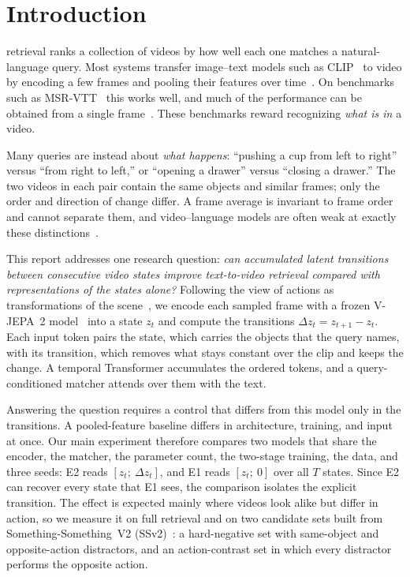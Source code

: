 \documentclass[lettersize,journal]{IEEEtran}
\begin{document}
\section{Introduction}
 retrieval ranks a collection of videos by how
well each one matches a natural-language query. Most systems transfer
image--text models such as CLIP~\cite{radford2021clip} to video by encoding a
few frames and pooling their features over
time~\cite{luo2022clip4clip,ma2022xclip,bain2021frozen}. On benchmarks such as
MSR-VTT~\cite{xu2016msrvtt} this works well, and much of the performance can be
obtained from a single frame~\cite{buch2022atp,lei2023singleframe}. These
benchmarks reward recognizing \emph{what is in} a video.

Many queries are instead about \emph{what happens}: ``pushing a cup from left
to right'' versus ``from right to left,'' or ``opening a drawer'' versus
``closing a drawer.'' The two videos in each pair contain the same objects and
similar frames; only the order and direction of change differ. A frame average
is invariant to frame order and cannot separate them, and video--language models
are often weak at exactly these
distinctions~\cite{bagad2023testoftime,wang2023paxion}.

This report addresses one research question: \emph{can accumulated latent
transitions between consecutive video states improve text-to-video retrieval
compared with representations of the states alone?} Following the view of
actions as transformations of the scene~\cite{wang2016actions}, we encode each
sampled frame with a frozen V-JEPA~2 model~\cite{assran2025vjepa2} into a state
$z_t$ and compute the transitions $\Delta z_t = z_{t+1}-z_t$. Each input token
pairs the state, which carries the objects that the query names, with its
transition, which removes what stays constant over the clip and keeps the
change. A temporal Transformer accumulates the ordered tokens, and a
query-conditioned matcher attends over them with the text.

Answering the question requires a control that differs from this model only in
the transitions. A pooled-feature baseline differs in architecture, training,
and input at once. Our main experiment therefore compares two models that share
the encoder, the matcher, the parameter count, the two-stage training, the data,
and three seeds: E2 reads $[z_t;\ \Delta z_t]$, and E1 reads $[z_t;\ 0]$ over all
$T$ states. Since E2 can recover every state that E1 sees, the comparison
isolates the explicit transition. The effect is expected mainly where videos
look alike but differ in action, so we measure it on full retrieval and on two
candidate sets built from Something-Something~V2 (SSv2)~\cite{goyal2017ssv2}: a
hard-negative set with same-object and opposite-action distractors, and an
action-contrast set in which every distractor performs the opposite action.
\end{document}
